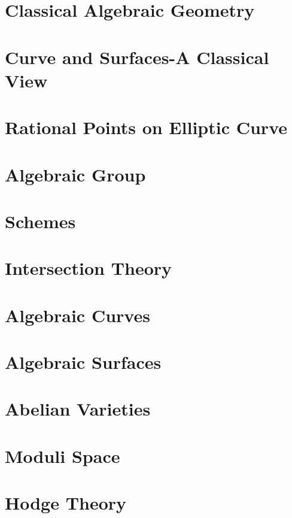 \documentclass{ModulEN}
\begin{document}
	\part{Classical Algebraic Geometry}
	
		
		
	\part{Curve and Surfaces-A Classical View}
	
	\part{Rational Points on Elliptic Curve}
	
	\part{Algebraic Group}
	
	\part{Schemes}
	
	\part{Intersection Theory}
	
	\part{Algebraic Curves}
	
		
	
	\part{Algebraic Surfaces}
	
		
	
	\part{Abelian Varieties}
		
			
		
	\part{Moduli Space}
	\part{Hodge Theory}
\end{document}
